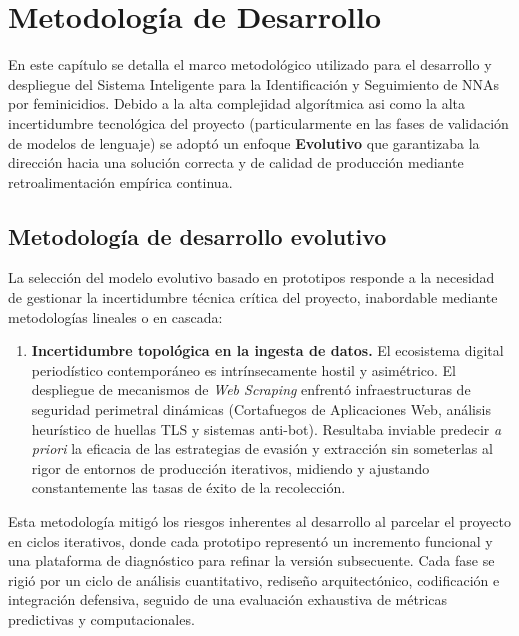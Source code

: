 

\chapter{Metodología de Desarrollo}
\label{cap:metodologia}

En este capítulo se detalla el marco metodológico utilizado para el desarrollo y
despliegue del Sistema Inteligente para la Identificación y Seguimiento
de NNAs por feminicidios. Debido a la alta complejidad algorítmica asi como la alta
incertidumbre tecnológica del proyecto (particularmente en las fases de validación
de modelos de lenguaje) se adoptó un enfoque \textbf{Evolutivo} que garantizaba
la dirección hacia una solución correcta y de calidad de producción mediante
retroalimentación empírica continua.

\section{Metodología de desarrollo evolutivo}
\label{sec:met_evolutivo}

La selección del modelo evolutivo basado en prototipos responde a la necesidad de gestionar la incertidumbre técnica
crítica del proyecto, inabordable mediante metodologías lineales o en cascada:

\begin{enumerate}
    \item \textbf{Incertidumbre topológica en la ingesta de datos.} El ecosistema 
    digital periodístico contemporáneo es intrínsecamente hostil y asimétrico. El 
    despliegue de mecanismos de \textit{Web Scraping} enfrentó infraestructuras de
    seguridad perimetral dinámicas (Cortafuegos de Aplicaciones Web, análisis 
    heurístico de huellas TLS y sistemas anti-bot). Resultaba inviable predecir 
    \textit{a priori} la eficacia de las estrategias de evasión y extracción sin 
    someterlas al rigor de entornos de producción iterativos, midiendo y ajustando
    constantemente las tasas de éxito de la recolección.
    
\end{enumerate}

Esta metodología mitigó los riesgos inherentes al desarrollo al parcelar el proyecto en ciclos iterativos, donde cada prototipo representó un incremento funcional y una plataforma de diagnóstico para refinar la versión subsecuente. Cada fase se rigió por un ciclo de análisis cuantitativo, rediseño arquitectónico, codificación e integración defensiva, seguido de una evaluación exhaustiva de métricas predictivas y computacionales.



